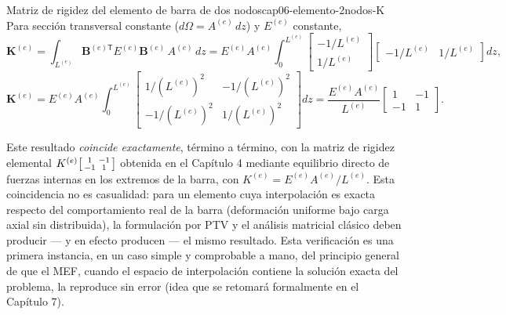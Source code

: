 \begin{ecnimportante}{Matriz de rigidez del elemento de barra de dos nodos}{cap06-elemento-2nodos-K}
Para sección transversal constante ($d\Omega = A^{(e)}\,dz$) y $E^{(e)}$ constante,
\[
\bm K^{(e)} = \int_{L^{(e)}} \bm B^{(e)\mathsf T} E^{(e)} \bm B^{(e)} \, A^{(e)}\, dz
= E^{(e)}A^{(e)} \int_0^{L^{(e)}} \begin{bmatrix} -1/L^{(e)} \\[2pt] 1/L^{(e)} \end{bmatrix} \begin{bmatrix} -1/L^{(e)} & 1/L^{(e)} \end{bmatrix} dz ,
\]
\[
\bm K^{(e)} = E^{(e)}A^{(e)} \int_0^{L^{(e)}} \begin{bmatrix} 1/(L^{(e)})^2 & -1/(L^{(e)})^2 \\ -1/(L^{(e)})^2 & 1/(L^{(e)})^2 \end{bmatrix} dz
= \frac{E^{(e)}A^{(e)}}{L^{(e)}} \begin{bmatrix} 1 & -1 \\ -1 & 1 \end{bmatrix} .
\]
\end{ecnimportante}

\begin{observacion}
Este resultado \emph{coincide exactamente}, término a término, con la matriz de rigidez elemental $K^{(e)}\begin{bsmallmatrix}1&-1\\-1&1\end{bsmallmatrix}$ obtenida en el Capítulo 4 mediante equilibrio directo de fuerzas internas en los extremos de la barra, con $K^{(e)}=E^{(e)}A^{(e)}/L^{(e)}$. Esta coincidencia no es casualidad: para un elemento cuya interpolación es exacta respecto del comportamiento real de la barra (deformación uniforme bajo carga axial sin distribuida), la formulación por PTV y el análisis matricial clásico deben producir --- y en efecto producen --- el mismo resultado. Esta verificación es una primera instancia, en un caso simple y comprobable a mano, del principio general de que el MEF, cuando el espacio de interpolación contiene la solución exacta del problema, la reproduce sin error (idea que se retomará formalmente en el Capítulo 7).
\end{observacion}

